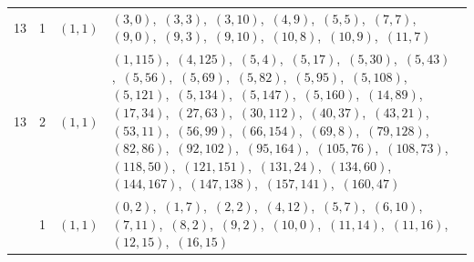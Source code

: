 \documentclass[11pt]{article}
\begin{document}
\begin{longtable}{@{}rrl>{\raggedright\arraybackslash}p{}@{}}
13 & 1 & $(1,1)$ & $(3,0)$,\allowbreak\ $(3,3)$,\allowbreak\ $(3,10)$,\allowbreak\ $(4,9)$,\allowbreak\ $(5,5)$,\allowbreak\ $(7,7)$,\allowbreak\ $(9,0)$,\allowbreak\ $(9,3)$,\allowbreak\ $(9,10)$,\allowbreak\ $(10,8)$,\allowbreak\ $(10,9)$,\allowbreak\ $(11,7)$\\
13 & 2 & $(1,1)$ & $(1,115)$,\allowbreak\ $(4,125)$,\allowbreak\ $(5,4)$,\allowbreak\ $(5,17)$,\allowbreak\ $(5,30)$,\allowbreak\ $(5,43)$,\allowbreak\ $(5,56)$,\allowbreak\ $(5,69)$,\allowbreak\ $(5,82)$,\allowbreak\ $(5,95)$,\allowbreak\ $(5,108)$,\allowbreak\ $(5,121)$,\allowbreak\ $(5,134)$,\allowbreak\ $(5,147)$,\allowbreak\ $(5,160)$,\allowbreak\ $(14,89)$,\allowbreak\ $(17,34)$,\allowbreak\ $(27,63)$,\allowbreak\ $(30,112)$,\allowbreak\ $(40,37)$,\allowbreak\ $(43,21)$,\allowbreak\ $(53,11)$,\allowbreak\ $(56,99)$,\allowbreak\ $(66,154)$,\allowbreak\ $(69,8)$,\allowbreak\ $(79,128)$,\allowbreak\ $(82,86)$,\allowbreak\ $(92,102)$,\allowbreak\ $(95,164)$,\allowbreak\ $(105,76)$,\allowbreak\ $(108,73)$,\allowbreak\ $(118,50)$,\allowbreak\ $(121,151)$,\allowbreak\ $(131,24)$,\allowbreak\ $(134,60)$,\allowbreak\ $(144,167)$,\allowbreak\ $(147,138)$,\allowbreak\ $(157,141)$,\allowbreak\ $(160,47)$\\
\addlinespace[3pt]
17 & 1 & $(1,1)$ & $(0,2)$,\allowbreak\ $(1,7)$,\allowbreak\ $(2,2)$,\allowbreak\ $(4,12)$,\allowbreak\ $(5,7)$,\allowbreak\ $(6,10)$,\allowbreak\ $(7,11)$,\allowbreak\ $(8,2)$,\allowbreak\ $(9,2)$,\allowbreak\ $(10,0)$,\allowbreak\ $(11,14)$,\allowbreak\ $(11,16)$,\allowbreak\ $(12,15)$,\allowbreak\ $(16,15)$\\

\end{longtable}
\end{document}
